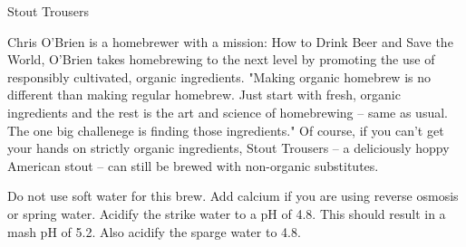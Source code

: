\begin{recipie}{Stout Trousers}

\begin{aboutblock}
Chris O'Brien is a homebrewer with a mission: How to Drink
Beer and Save the World, O'Brien takes homebrewing to the next level
by promoting the use of responsibly cultivated, organic ingredients.
"Making organic homebrew is no different than making regular homebrew.
Just start with fresh, organic ingredients and the rest is the art and
science of homebrewing -- same as usual. The one big challenege is finding those ingredients." Of course, if you can't get your hands on strictly
organic ingredients, Stout Trousers -- a deliciously hoppy American
stout -- can still be brewed with non-organic substitutes.
\end{aboutblock}


\begin{methodandtiming}
 
\begin{mashsteps}
\end{mashsteps}

\begin{fermentationsteps}
\end{fermentationsteps}

\begin{directions}
Do not use soft water for this brew. Add calcium if you are using reverse
osmosis or spring water. Acidify the strike water to a pH of 4.8. This should
result in a mash pH of 5.2. Also acidify the sparge water to 4.8.
\end{directions}

\end{methodandtiming}

\begin{ingredientsblock}

\begin{malts}
\end{malts}

\begin{hops}
\end{hops}

\begin{yeasts}
\end{yeasts}

\end{ingredientsblock}

\end{recipie}